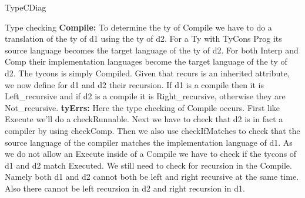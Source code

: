 \documentclass{article}
\begin{document}
\begin{subsection}{TypeCDiag}
\begin{subsubsection}{Type checking}
\textbf{Compile:} To determine the ty of Compile we have to do a translation of the ty of d1 using the ty of d2. For a Ty with TyCons Prog its source language becomes the target language of the ty of d2. For both Interp and Comp their implementation languages become the target language of the ty of d2. The tycons is simply Compiled. Given that recurs is an inherited attribute, we now define for d1 and d2 their recursion. If d1 is a compile then it is Left\_recursive and if d2 is a compile it is Right\_recursive, otherwise they are Not\_recursive. 
\textbf{tyErrs:} Here the type checking of Compile occurs. First like Execute we'll do a checkRunnable. Next we have to check that d2 is in fact a compiler by using checkComp. Then we also use checkIfMatches to check that the source language of the compiler matches the implementation language of d1. As we do not allow an Execute inside of a Compile we have to check if the tycons of d1 and d2 match Executed. We still need to check for recursion in the Compile. Namely both d1 and d2 cannot both be left and right recursive at the same time. Also there cannot be left recursion in d2 and right recursion in d1.
\end{subsubsection}
\end{subsection}
\end{document}
